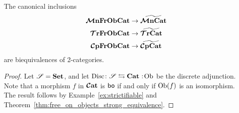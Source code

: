 \documentclass[11pt,oneside,article]{memoir}
\begin{document}
\begin{corollary}
    \label{cor:object_frees}
  The canonical inclusions
  \begin{align*}
    \bm{\mathcal{M}}\mathbf{nFrObCat} &\to \widetilde{\bm{\mathcal{M}}\mathbf{nCat}} \\
    \bm{\mathcal{T}}\mathbf{rFrObCat} &\to \widetilde{\bm{\mathcal{T}}\mathbf{rCat}} \\
    \bm{\mathcal{C}}\mathbf{pFrObCat} &\to \widetilde{\bm{\mathcal{C}}\mathbf{pCat}}
  \end{align*}
  are biequivalences of 2-categories.
\end{corollary}
\begin{proof}
  Let $\mathscr{S}=\mathbf{Set}$, and let $\Disc\colon\cat{S}\leftrightarrows\Cat\cocolon\Ob$ be the discrete
  adjunction. Note that a morphism $f$ in $\bm{\mathcal{C}}\mathbf{at}$ is $\mathsf{bo}$ if and only if $\mathrm{Ob}(f)$ is an
  isomorphism. The result follows by Example~\ref{ex:strictifiable} and
  Theorem~\ref{thm:free_on_objects_strong_equivalence}.
\end{proof}
\end{document}
